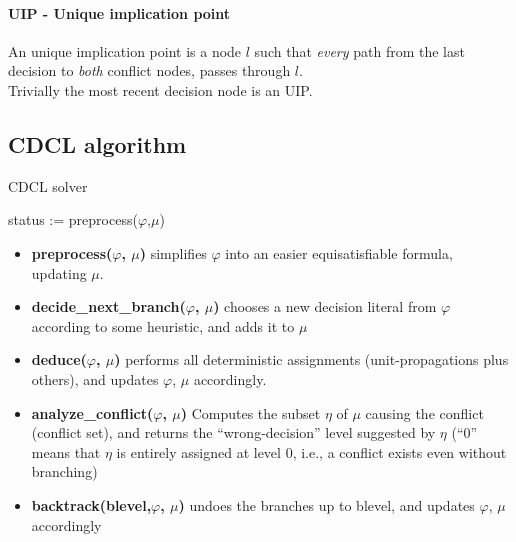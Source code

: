 \documentclass{article}
\begin{document}
\paragraph{UIP - Unique implication point}
An unique implication point is a node $l$ such that \textit{every} path from the last decision to \textit{both} conflict nodes, passes through $l$.\\Trivially the most recent decision node is an UIP.

\subsection{CDCL algorithm}
\begin{algorithm}[h]
    \caption{CDCL solver}
    status := preprocess($\varphi$,$\mu$)\;
\end{algorithm}
\begin{itemize}
    \item \textbf{preprocess($\varphi$, $\mu$)} simplifies $\varphi$ into an easier equisatisfiable formula, updating $\mu$.
    \item \textbf{decide\_next\_branch($\varphi$, $\mu$)} chooses a new decision literal from $\varphi$ according to some heuristic, and adds it to $\mu$
    \item \textbf{deduce($\varphi$, $\mu$)} performs all deterministic assignments (unit-propagations plus others), and updates $\varphi$, $\mu$ accordingly.
    \item \textbf{analyze\_conflict($\varphi$, $\mu$)} Computes the subset $\eta$ of $\mu$ causing the conflict (conflict set), and returns the “wrong-decision” level suggested by $\eta$ (“0” means that $\eta$ is entirely assigned at level 0, i.e., a conflict exists even without branching)
    \item \textbf{backtrack(blevel,$\varphi$, $\mu$)} undoes the branches up to blevel, and updates $\varphi$, $\mu$ accordingly
\end{itemize}
\end{document}
